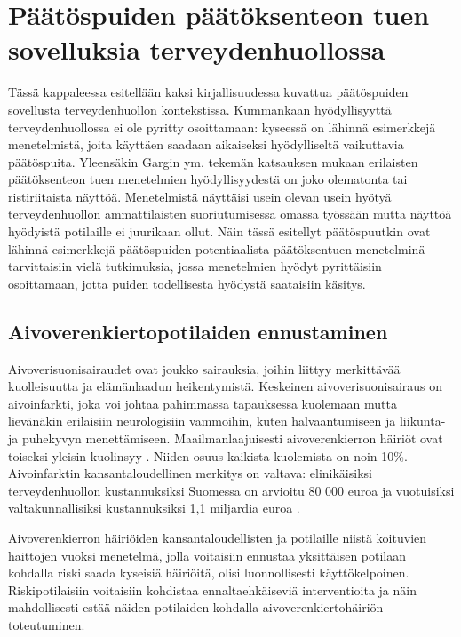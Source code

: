 \documentclass[12pt,finnish]{tktltiki2}
\theoremstyle{definition}
\theoremstyle{remark}
\begin{document}
\section{Päätöspuiden päätöksenteon tuen sovelluksia terveydenhuollossa}
\label{sec:sovellukset_terveydenhuollossa}
Tässä kappaleessa esitellään kaksi kirjallisuudessa kuvattua päätöspuiden sovellusta terveydenhuollon kontekstissa.
Kummankaan hyödyllisyyttä terveydenhuollossa ei ole pyritty osoittamaan: kyseessä on lähinnä
esimerkkejä menetelmistä, joita käyttäen saadaan aikaiseksi hyödylliseltä vaikuttavia päätöspuita.
Yleensäkin Gargin ym. tekemän katsauksen \cite{JamaCDSreview} mukaan erilaisten päätöksenteon tuen
menetelmien hyödyllisyydestä on joko olematonta tai ristiriitaista näyttöä. Menetelmistä näyttäisi
usein olevan usein hyötyä terveydenhuollon ammattilaisten suoriutumisessa omassa työssään mutta
näyttöä hyödyistä potilaille ei juurikaan ollut. Näin tässä esitellyt päätöspuutkin ovat
lähinnä esimerkkejä päätöspuiden potentiaalista päätöksentuen menetelminä - tarvittaisiin
vielä tutkimuksia, jossa menetelmien hyödyt pyrittäisiin osoittamaan, jotta
puiden todellisesta hyödystä saataisiin käsitys.



\subsection{Aivoverenkiertopotilaiden ennustaminen}
Aivoverisuonisairaudet ovat joukko sairauksia, joihin liittyy merkittävää kuolleisuutta ja elämänlaadun heikentymistä.
Keskeinen aivoverisuonisairaus on aivoinfarkti, joka
voi johtaa pahimmassa tapauksessa kuolemaan mutta lievänäkin erilaisiin neurologisiin vammoihin, kuten
halvaantumiseen ja liikunta- ja puhekyvyn menettämiseen. Maailmanlaajuisesti aivoverenkierron häiriöt ovat toiseksi yleisin
kuolinsyy \cite{burdenOfDisease}. Niiden osuus kaikista kuolemista on noin 10\%.
Aivoinfarktin kansantaloudellinen merkitys on valtava: elinikäisiksi terveydenhuollon kustannuksiksi
Suomessa on arvioitu 80 000 euroa ja vuotuisiksi valtakunnallisiksi kustannuksiksi 1,1 miljardia euroa
\cite{aivoinfarktinKustannuksetTHL}.

Aivoverenkierron häiriöiden kansantaloudellisten ja potilaille niistä koituvien haittojen vuoksi
menetelmä, jolla voitaisiin ennustaa yksittäisen potilaan kohdalla riski saada kyseisiä häiriöitä,
olisi luonnollisesti käyttökelpoinen. Riskipotilaisiin voitaisiin kohdistaa ennaltaehkäiseviä
interventioita ja näin mahdollisesti estää näiden potilaiden kohdalla aivoverenkiertohäiriön
toteutuminen.
\end{document}
